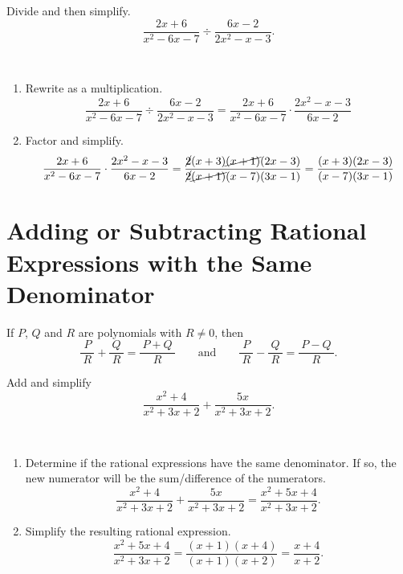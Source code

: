 \documentclass[en,11pt]{elegantbook}
\let\BeginKnitrBlock\begin \let\EndKnitrBlock\end
\begin{document}
\BeginKnitrBlock{example}
\protect\hypertarget{exm:unnamed-chunk-40}{}{\label{exm:unnamed-chunk-40} }
Divide and then simplify.\\
\[
\dfrac{2x+6}{x^2-6x-7}\div \dfrac{6x-2}{2x^2-x-3}.
\]
\EndKnitrBlock{example}

\BeginKnitrBlock{solution}
{}\\

\begin{enumerate}
\def\labelenumi{\arabic{enumi}.}

\item
  Rewrite as a multiplication.\\
  \[
  \dfrac{2x+6}{x^2-6x-7}\div \dfrac{6x-2}{2x^2-x-3}=\dfrac{2x+6}{x^2-6x-7}\cdot \dfrac{2x^2-x-3}{6x-2}
  \]
\item
  Factor and simplify.\\
  \[
  \dfrac{2x+6}{x^2-6x-7}\cdot\dfrac{2x^2-x-3}{6x-2}
  =\dfrac{\cancel{2}(x+3)\cancel{(x+1)}(2x-3)}{\cancel{2}\cancel{(x+1)}(x-7)(3x-1)}
  =\dfrac{(x+3)(2x-3)}{(x-7)(3x-1)}
  \]
\end{enumerate}
\EndKnitrBlock{solution}

\hypertarget{adding-or-subtracting-rational-expressions-with-the-same-denominator}{%
\section{Adding or Subtracting Rational Expressions with the Same Denominator}\label{adding-or-subtracting-rational-expressions-with-the-same-denominator}}

If \(P\), \(Q\) and \(R\) are polynomials with \(R\neq 0\), then
\[
\dfrac{~P~}{~R~}+\dfrac{~Q~}{~R~}=\dfrac{~P+Q~}{~R~}\qquad \text{and} \qquad
\dfrac{~P~}{~R~}-\dfrac{~Q~}{~R~}=\dfrac{~P-Q~}{~R~}.
\]

\BeginKnitrBlock{example}
\protect\hypertarget{exm:unnamed-chunk-42}{}{\label{exm:unnamed-chunk-42} }
Add and simplify\\
\[
\dfrac{x^2+4}{x^2+3x+2}+\dfrac{5x}{x^2+3x+2}.
\]
\EndKnitrBlock{example}

\BeginKnitrBlock{solution}
{}\\

\begin{enumerate}
\def\labelenumi{\arabic{enumi}.}

\item
  Determine if the rational expressions have the same denominator. If so, the new numerator will be the sum/difference of the numerators.
  \[
   \dfrac{x^2+4}{x^2+3x+2}+\dfrac{5x}{x^2+3x+2}=\dfrac{x^2+5x+4}{x^2+3x+2}.
  \]
\item
  Simplify the resulting rational expression.
  \[
   \dfrac{x^2+5x+4}{x^2+3x+2}=\dfrac{(x+1)(x+4)}{(x+1)(x+2)}=\dfrac{x+4}{x+2}.
  \]
\end{enumerate}
\EndKnitrBlock{solution}
\end{document}
